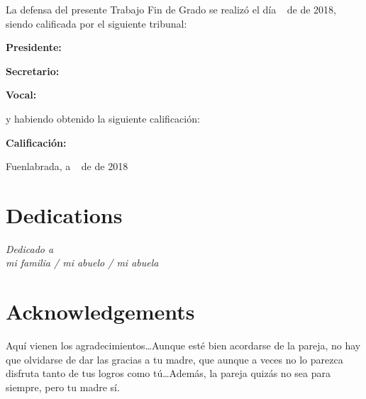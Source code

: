 \documentclass[a4paper, 12pt]{book}
\begin{document}
\vspace{1cm}
La defensa del presente Trabajo Fin de Grado se realizó el día \qquad$\;\,$ de \qquad\qquad\qquad\qquad \newline de 2018, siendo calificada por el siguiente tribunal:


\vspace{0.5cm}
\textbf{Presidente:}

\vspace{1.2cm}
\textbf{Secretario:}

\vspace{1.2cm}
\textbf{Vocal:}


\vspace{1.2cm}
y habiendo obtenido la siguiente calificación:

\vspace{1cm}
\textbf{Calificación:}


\vspace{1cm}
\begin{flushright}
Fuenlabrada, a \qquad$\;\,$ de \qquad\qquad\qquad\qquad de 2018
\end{flushright}


\chapter*{Dedications}
\begin{flushright}
\textit{Dedicado a \\
mi familia / mi abuelo / mi abuela}
\end{flushright}


\chapter*{Acknowledgements}

Aquí vienen los agradecimientos\ldots Aunque esté bien acordarse de la pareja,
no hay que olvidarse de dar las gracias a tu madre, que aunque a veces no lo
parezca disfruta tanto de tus logros como tú\ldots Además, la pareja quizás
no sea para siempre, pero tu madre sí.
\end{document}
